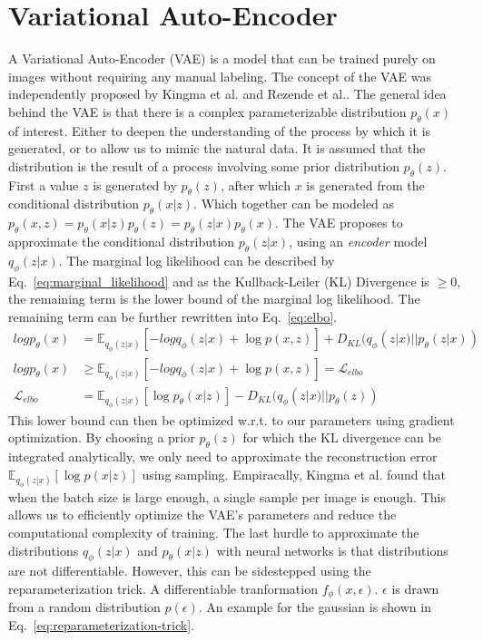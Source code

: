 \section{Variational Auto-Encoder}
A Variational Auto-Encoder (VAE) is a model that can be trained purely on images without requiring any manual labeling. The concept of the VAE was independently proposed by Kingma et al. \cite{kingma2014autoencodingvariationalbayes} and Rezende et al.\cite{rezende2014stochastic}. The general idea behind the VAE is that there is a complex parameterizable distribution $p_\theta(x)$ of interest. Either to deepen the understanding of the process by which it is generated, or to allow us to mimic the natural data. It is assumed that the distribution is the result of a process involving some prior distribution $p_\theta(z)$. First a value $z$ is generated by $p_\theta(z)$, after which $x$ is generated from the conditional distribution $p_\theta(x | z)$. Which together can be modeled as $p_\theta(x, z) = p_\theta(x|z)p_\theta(z) = p_\theta(z|x)p_\theta(x)$. The VAE proposes to approximate the conditional distribution $p_\theta(z|x)$, using an \emph{encoder} model $q_\phi(z|x)$. The marginal log likelihood can be described by Eq.~\ref{eq:marginal_likelihood} and as the Kullback-Leiler (KL) Divergence is $\geq 0$, the remaining term is the lower bound of the marginal log likelihood. The remaining term can be further rewritten into Eq.~\ref{eq:elbo}.
\begin{subequations}
    \begin{align}
        log p_\theta(x)    & = \mathbb{E}_{q_{\phi}(z|x)}[-log q_\phi(z|x) + \log p(x,z)] + D_{KL}(q_{\phi}(z|x) || p_\theta(z|x))\label{eq:marginal_likelihood} \\
        log p_\theta(x)    & \geq \mathbb{E}_{q_{\phi}(z|x)}[-log q_\phi(z|x) + \log p(x,z)] = \mathcal{L}_{elbo}                                                \\
        \mathcal{L}_{elbo} & = \mathbb{E}_{q_{\phi}(z|x)}[\log p_\theta(x|z)] - D_{KL}(q_{\phi}(z|x) || p_\theta(z))\label{eq:elbo}
    \end{align}
\end{subequations}
This lower bound can then be optimized w.r.t. to our parameters using gradient optimization. By choosing a prior $p_\theta(z)$ for which the KL divergence can be integrated analytically, we only need to approximate the reconstruction error $\mathbb{E}_{q_{\phi}(z|x)}[\log p(x|z)]$ using sampling. Empiracally, Kingma et al. found that when the batch size is large enough, a single sample per image is enough. This allows us to efficiently optimize the VAE's parameters and reduce the computational complexity of training. The last hurdle to approximate the distributions $q_{\phi}(z | x)$ and $p_{\theta}(x | z)$ with neural networks is that distributions are not differentiable. However, this can be sidestepped using the reparameterization trick. A differentiable tranformation $f_\phi(x, \epsilon)$. $\epsilon$ is drawn from a random distribution $p(\epsilon)$. An example for the gaussian is shown in Eq.~\ref{eq:reparameterization-trick}.
